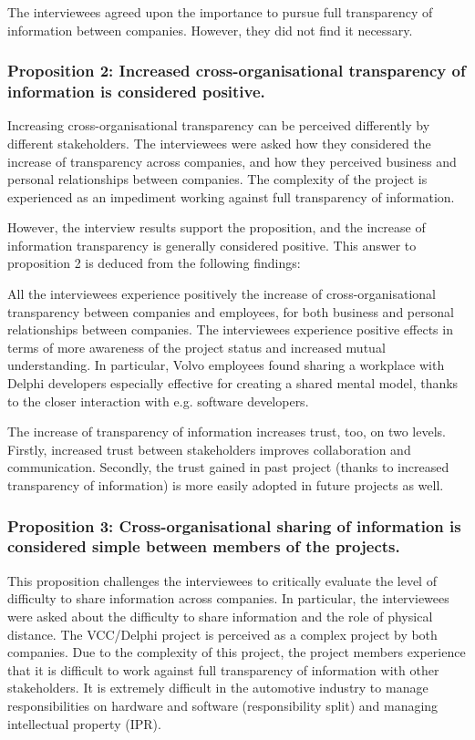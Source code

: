  The interviewees agreed upon the importance to pursue full transparency of information between companies. However, they did not find it necessary.

\subsubsection{Proposition 2: Increased cross-organisational transparency of information is considered positive.}

Increasing cross-organisational transparency can be perceived differently by different stakeholders. The interviewees were asked how they considered the increase of transparency across companies, and how they perceived business and personal relationships between companies. The complexity of the project is experienced as an impediment working against full transparency of information.

However, the interview results support the proposition, and the increase of information transparency is generally considered positive. This answer to proposition 2 is deduced from the following findings:

 All the interviewees experience positively the increase of cross-organisational transparency between companies and employees, for both business and personal relationships between companies. The interviewees experience positive effects in terms of more awareness of the project status and increased mutual understanding. In particular, Volvo employees found sharing a workplace with Delphi developers especially effective for creating a shared mental model, thanks to the closer interaction with e.g. software developers.

 The increase of transparency of information increases trust, too, on two levels. Firstly, increased trust between stakeholders improves collaboration and communication. Secondly, the trust gained in past project (thanks to increased transparency of information) is more easily adopted in future projects as well. 

\subsubsection{Proposition 3: Cross-organisational sharing of information is considered simple between members of the projects.}

This proposition challenges the interviewees to critically evaluate the level of difficulty to share information across companies. In particular, the interviewees were asked about the difficulty to share information and the role of physical distance. The VCC/Delphi project is perceived as a complex project by both companies. Due to the complexity of this project, the project members experience that it is difficult to work against full transparency of information with other stakeholders. It is extremely difficult in the automotive industry to manage responsibilities on hardware and software (responsibility split) and managing intellectual property (IPR).

